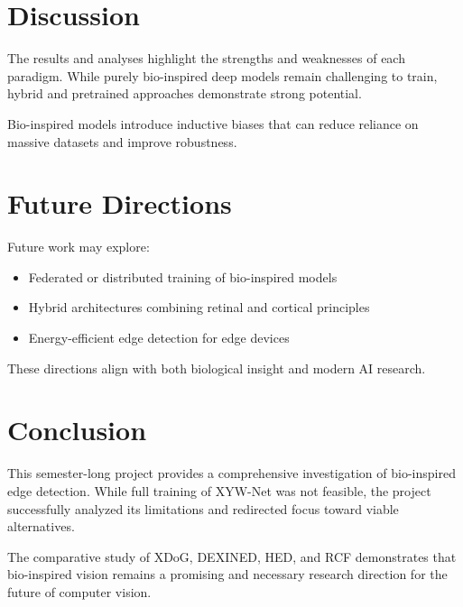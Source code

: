 \documentclass[12pt]{article}
\begin{document}
\section{Discussion}

The results and analyses highlight the strengths and weaknesses of each paradigm.
While purely bio-inspired deep models remain challenging to train, hybrid and
pretrained approaches demonstrate strong potential.

Bio-inspired models introduce inductive biases that can reduce reliance on massive
datasets and improve robustness.

\section{Future Directions}

Future work may explore:
\begin{itemize}
\item Federated or distributed training of bio-inspired models
\item Hybrid architectures combining retinal and cortical principles
\item Energy-efficient edge detection for edge devices
\end{itemize}

These directions align with both biological insight and modern AI research.

\section{Conclusion}

This semester-long project provides a comprehensive investigation of bio-inspired
edge detection. While full training of XYW-Net was not feasible, the project
successfully analyzed its limitations and redirected focus toward viable
alternatives.

The comparative study of XDoG, DEXINED, HED, and RCF demonstrates that
bio-inspired vision remains a promising and necessary research direction for the
future of computer vision.
\end{document}
